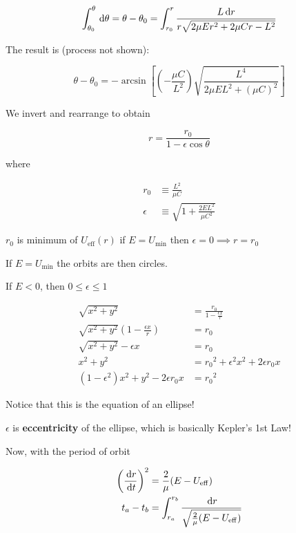 \begin{equation}
	\int_{\theta_0}^\theta \D \theta = \theta - \theta_0 = \int_{r_0}^r \frac{L \D r}{r \sqrt{2 \mu E r^2 + 2 \mu Cr - L^2}}
\end{equation}

The result is (process not shown):

\begin{equation}
	\theta - \theta_0 = - \arcsin \left[\left(- \frac{\mu C}{L^2}\right) \sqrt{\frac{L^4}{2\mu E L^2 + (\mu C)^2}}\right]
\end{equation}

We invert and rearrange to obtain

\begin{equation}
	r = \frac{r_0}{1 - \epsilon \cos\theta}
\end{equation}

where

\begin{align}
	r_0 &\equiv \frac{L^2}{\mu C}\\
	\epsilon &\equiv \sqrt{1 + \frac{2 E L^2}{\mu C^2}}
\end{align}

\begin{remark}
	$r_0$ is minimum of $U_\mathrm{eff}(r)$ if $E = U_\mathrm{min}$ then $\epsilon = 0 \implies r = r_0$

	If $E = U_\mathrm{min}$ the orbits are then circles.

	If $E < 0$, then $0 \leq \epsilon \leq 1$

	\medskip

	\begin{align}
		\sqrt{x^2 + y^2} &= \frac{r_0}{1 - \frac{\epsilon x}{r}}\\
		\sqrt{x^2 + y^2} \left(1 - \frac{\epsilon x}{r}\right)&= r_0\\
		\sqrt{x^2 + y^2} - \epsilon x &= r_0\\
		x^2 + y^2 &= {r_0}^2 + \epsilon^2 x^2 + 2 \epsilon r_0 x\\
		(1 - \epsilon^2)x^2 + y^2 - 2 \epsilon r_0 x &= {r_0}^2
	\end{align}

	Notice that this is the equation of an ellipse!

	$\epsilon$ is \textbf{eccentricity} of the ellipse, which is basically Kepler's 1st Law!
\end{remark}

Now, with the period of orbit

\begin{align}
	\left(\frac{\D r}{\D t}\right)^2 &= \frac{2}{\mu} (E - U_\mathrm{eff})\\
	t_a - t_b &= \int_{r_a}^{r_b} \frac{\D r}{\sqrt{\frac{2}{\mu} (E - U_\mathrm{eff})}}
\end{align}

